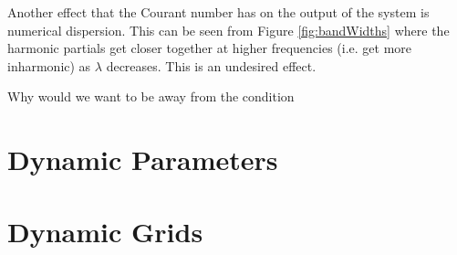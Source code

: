 \documentclass[preprint]{JASA}
\begin{document}
Another effect that the Courant number has on the output of the system is numerical dispersion. This can be seen from Figure \ref{fig:bandWidths} where the harmonic partials get closer together at higher frequencies (i.e. get more inharmonic) as $\lambda$ decreases. This is an undesired effect.


Why would we want to be away from the condition

\section{Dynamic Parameters}

\section{Dynamic Grids}


\end{document}
